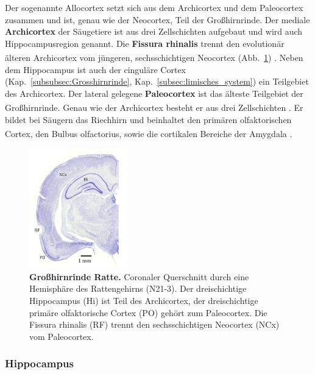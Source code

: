 \documentclass[12pt,a4paper,pdftex]{article}
\begin{document}
Der sogenannte Allocortex setzt sich aus dem Archicortex und dem Paleocortex zusammen und ist, genau wie der Neocortex, Teil der Großhirnrinde. Der mediale \textbf{Archicortex} der Säugetiere ist aus drei Zellschichten aufgebaut und wird auch Hippocampusregion genannt. Die \textbf{Fissura rhinalis} trennt den evolutionär älteren Archicortex vom jüngeren, sechsschichtigen Neocortex (Abb.~\ref{fig:allocortex_ratte}) \textsuperscript{\cite[6]{storch2012lehrbuchzoo}}. Neben dem Hippocampus ist auch der cinguläre Cortex (Kap.~\ref{subsubsec:Grosshirnrinde}, Kap.~\ref{subsec:limisches_system}) ein Teilgebiet des Archicortex. Der lateral gelegene \textbf{Paleocortex} ist das älteste Teilgebiet der Großhirnrinde. Genau wie der Archicortex besteht er aus drei Zellschichten \textsuperscript{\cite[6]{storch2012lehrbuchzoo}}. Er bildet bei Säugern das Riechhirn und beinhaltet den primären olfaktorischen Cortex, den Bulbus olfactorius, sowie die cortikalen Bereiche der Amygdala \textsuperscript{\cite[9]{trepel2011neuroanatomie}}.

\begin{figure}[H]
    \centering
    \includegraphics[width=0.38\textwidth]{pictures/Bilder_Jule/Ratte/RF.png}
    \caption[Großhirnrinde Ratte]{\textbf{Großhirnrinde Ratte.} Coronaler Querschnitt durch eine Hemisphäre des Rattengehirns (N21-3). Der dreischichtige Hippocampus (Hi) ist Teil des Archicortex, der dreischichtige primäre olfaktorische Cortex (PO) gehört zum Paleocortex. Die Fissura rhinalis (RF) trennt den sechsschichtigen Neocortex (NCx) vom Paleocortex.}
    \label{fig:allocortex_ratte}
\end{figure}{}

\subsubsection*{Hippocampus}
\label{subsubsec:Hippocampus} 
\end{document}
